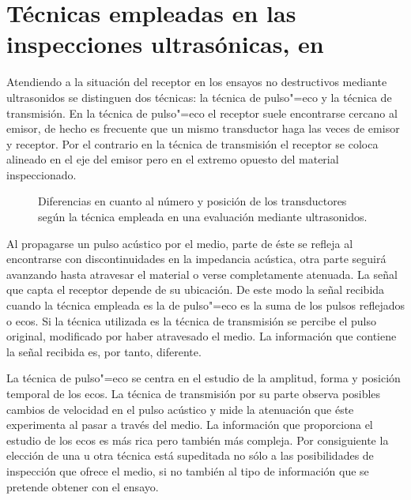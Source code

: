 \section[Técnicas empleadas en las inspecciones ultrasónicas]{Técnicas
empleadas en las inspecciones ultrasónicas, en
}\label{sec:technics}

Atendiendo a la situación del receptor en los ensayos no destructivos
mediante ultrasonidos se distinguen dos técnicas: la técnica de pulso"=eco
y la técnica de transmisión. En la técnica de pulso"=eco el receptor suele
encontrarse cercano al emisor, de hecho es frecuente que un mismo
transductor haga las veces de emisor y receptor. Por el contrario en la
técnica de transmisión el receptor se coloca alineado en el eje del emisor
pero en el extremo opuesto del material inspeccionado.

\begin{figure}
    \begin{center}
	    \vspace*{.1\textheight}
    \end{center}
    \caption[Técnicas empleadas en ]{Diferencias en cuanto al
    número y posición de los transductores según la técnica empleada en una
    evaluación mediante ultrasonidos.}
    \label{fig:technics}
\end{figure}

Al propagarse un pulso acústico por el medio, parte de éste se refleja al
encontrarse con discontinuidades en la impedancia acústica, otra parte
seguirá avanzando hasta atravesar el material o verse completamente
atenuada. La señal que capta el receptor depende de su ubicación. De este
modo la señal recibida cuando la técnica empleada es la de pulso"=eco es la
suma de los pulsos reflejados o ecos. Si la técnica utilizada es la técnica
de transmisión se percibe el pulso original, modificado por haber
atravesado el medio. La información que contiene la señal recibida es, por
tanto, diferente.

La técnica de pulso"=eco se centra en el estudio de la amplitud, forma y
posición temporal de los ecos. La técnica de transmisión por su parte
observa posibles cambios de velocidad en el pulso acústico y mide la
atenuación que éste experimenta al pasar a través del medio. La información
que proporciona el estudio de los ecos es más rica pero también más
compleja. Por consiguiente la elección de una u otra técnica está
supeditada no sólo a las posibilidades de inspección que ofrece el medio,
si no también al tipo de información que se pretende obtener con el ensayo.


